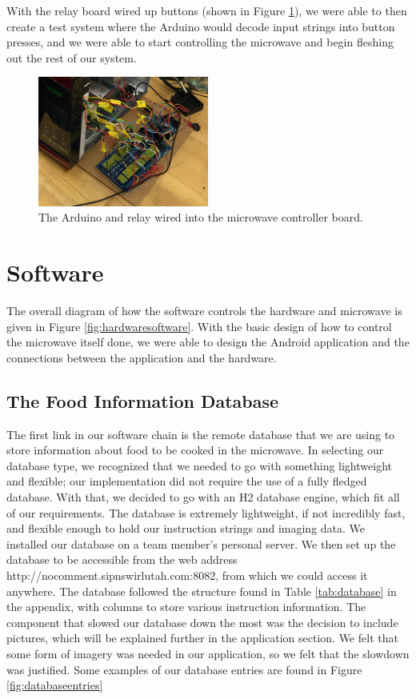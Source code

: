 \documentclass[10pt,journal,letterpaper,twocolumn]{IEEEtran}
\begin{document}
With the relay board wired up buttons (shown in Figure \ref{fig:arduinorelaywired}), we were able to then create a test system where the Arduino would decode input strings into button presses, and we were able to start controlling the microwave and begin fleshing out the rest of our system.

\begin{figure}[h]
\centering
\includegraphics[width=0.5\textwidth]{ArduinoRelayWired.JPG}
\caption{\label{fig:arduinorelaywired}The Arduino and relay wired into the microwave controller board.}
\end{figure}

\section{Software}

The overall diagram of how the software controls the hardware and microwave is given in Figure \ref{fig:hardwaresoftware}.  With the basic design of how to control the microwave itself done, we were able to design the Android application and the connections between the application and the hardware.  

\subsection*{The Food Information Database}
The first link in our software chain is the remote database that we are using to store information about food to be cooked in the microwave.  In selecting our database type, we recognized that we needed to go with something lightweight and flexible;  our implementation did not require the use of a fully fledged database.  With that, we decided to go with an H2 database engine, which fit all of our requirements.  The database is extremely lightweight, if not incredibly fast, and flexible enough to hold our instruction strings and imaging data.  We installed our database on a team member's personal server.  We then set up the database to be accessible from the web address http://nocomment.sipnswirlutah.com:8082, from which we could access it anywhere. The database followed the structure found in Table \ref{tab:database} in the appendix, with columns to store various instruction information.  The component that slowed our database down the most was the decision to include pictures, which will be explained further in the application section.  We felt that some form of imagery was needed in our application, so we felt that the slowdown was justified.  Some examples of our database entries are found in Figure \ref{fig:databaseentries}
\end{document}
